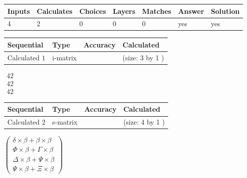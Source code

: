 \documentclass[12pt]{article}
\begin{document}
 

 
 
\noindent{}
 
 

 
\vspace{0.3in}
   
   
   
   
\noindent\begin{tabular}{|l|l|l|l|l|l|l|}
 \hline
Inputs & Calculates & Choices & Layers & Matches & Answer & Solution \\ \hline
           4  & 
           2  & 
           0
  & 
           0  & 
           0  & 
  yes & 
  yes 
  \\ \hline
 \end{tabular}
   
   
   
   
\noindent{}
   
   
  
  
\noindent\begin{tabular}{|l|l|l|l|}
\hline
 Sequential & Type & Accuracy & Calculated \\ 
\hline
 
 
  Calculated $            1 $ & i-matrix &  & 
 (size:            3  by            1 )
 \\  \hline  
 \end{tabular}
   
   
$\begin{array}{
 c
 }
          42  \\ 
          42  \\ 
          42
 \end{array}  $ 
  
  
\noindent\begin{tabular}{|l|l|l|l|}
\hline
 Sequential & Type & Accuracy & Calculated \\ 
\hline
 
 
  Calculated $            2 $ & s-matrix & & 
 (size:            4  by            1 )
 \\  \hline  
 \end{tabular}
   
   
 $  \left( \begin{array}
 {
 c
 }
  \delta \times  \beta +  \beta \times  \beta \\ 
  \Phi \times  \beta +  \Gamma \times  \beta \\ 
  \Delta \times  \beta +  \Psi \times  \beta \\ 
  \Psi \times  \beta +                     \Xi \times  \beta
 \end{array} \right) $ 
   
\end{document}
